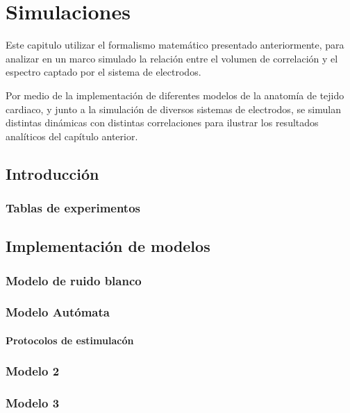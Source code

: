 \chapter{Simulaciones}
\begin{resumen}

Este capitulo utilizar el formalismo matemático presentado anteriormente, para analizar en un marco simulado la relación entre el volumen de correlación y el espectro captado por el sistema de electrodos.

Por medio de la implementación de diferentes modelos de la anatomía de tejido cardiaco, y junto a la simulación de diversos sistemas de electrodos, se simulan distintas dinámicas con distintas correlaciones  para ilustrar los resultados analíticos del capítulo anterior.


\end{resumen}

\section{Introducción}

\subsection{Tablas de experimentos}

\section{Implementación de modelos}
\subsection{Modelo de ruido blanco}
\subsection{Modelo Autómata}
\subsubsection{Protocolos de estimulacón}
\subsection{Modelo 2}
\subsection{Modelo 3}
